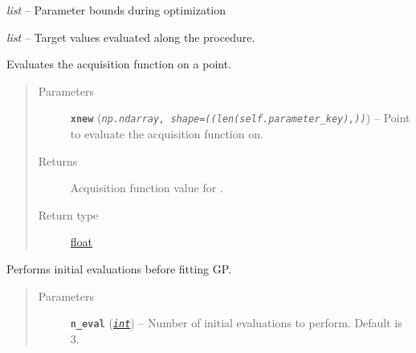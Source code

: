 \documentclass[letterpaper,10pt,english]{sphinxmanual}
\begin{document}
\begin{fulllineitems}
\begin{fulllineitems}
\end{fulllineitems}


\begin{fulllineitems}
\label{pyGPGO.GPGO:pyGPGO.GPGO.GPGO.parameter_range}
\emph{list} -- Parameter bounds during optimization

\end{fulllineitems}


\begin{fulllineitems}
\label{pyGPGO.GPGO:pyGPGO.GPGO.GPGO.history}
\emph{list} -- Target values evaluated along the procedure.

\end{fulllineitems}


\begin{fulllineitems}
\label{pyGPGO.GPGO:pyGPGO.GPGO.GPGO._acqWrapper}
Evaluates the acquisition function on a point.
\begin{quote}\begin{description}
\item[{Parameters}] \leavevmode
\textbf{\texttt{xnew}} (\emph{\texttt{np.ndarray, shape=((len(self.parameter\_key),))}}) -- Point to evaluate the acquisition function on.

\item[{Returns}] \leavevmode
Acquisition function value for .

\item[{Return type}] \leavevmode
\href{https://docs.python.org/2/library/functions.html\#float}{float}

\end{description}\end{quote}

\end{fulllineitems}


\begin{fulllineitems}
\label{pyGPGO.GPGO:pyGPGO.GPGO.GPGO._firstRun}
Performs initial evaluations before fitting GP.
\begin{quote}\begin{description}
\item[{Parameters}] \leavevmode
\textbf{\texttt{n\_eval}} (\href{https://docs.python.org/2/library/functions.html\#int}{\emph{\texttt{int}}}) -- Number of initial evaluations to perform. Default is 3.


\end{description}
\end{quote}
\end{fulllineitems}
\end{fulllineitems}
\end{document}
